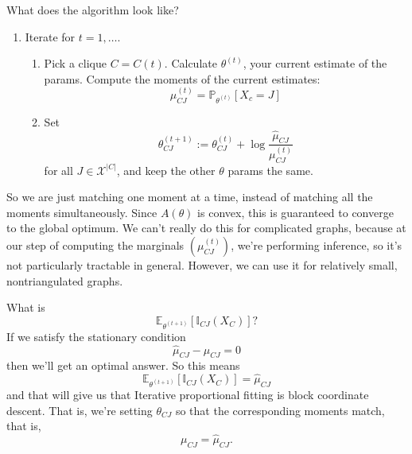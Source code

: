 \documentclass{article}
\newcommand{\E}{\mathbb{E}}
\begin{document}
What does the algorithm look like?
\begin{enumerate}
\item
Iterate for $t = 1,\ldots$.
\begin{enumerate}
	\item
	Pick a clique $C = C(t)$.
	Calculate $\theta^{(t)}$, your current estimate of the params.
	Compute the moments of the current estimates:
	$$
	\mu_{CJ}^{(t)} = \mathbb P_{\theta^{(t)}}[X_c = J]
	$$
	
	\item
	Set
	$$
	\theta_{CJ}^{(t+1)} :=
	\theta_{CJ}^{(t)} + \log\frac{{\hat\mu_{CJ}}}  {\mu^{(t)}_{CJ}}
	$$
	for all $ J\in \mathcal X^{|C|}$,
	and keep the other $\theta$ params the same.
\end{enumerate}
\end{enumerate}
So we are just matching one moment at a time, instead of matching all the moments simultaneously.
Since $A(\theta)$ is convex, this is guaranteed to converge to the global optimum.
We can't really do this for complicated graphs, because at our step of computing the marginals $(\mu_{CJ}^{(t)})$, we're performing inference, so it's not particularly tractable in general.
However, we can use it for relatively small, nontriangulated graphs.

What is
$$
\E_{\theta^{(t+1)}}[\mathbb I_{CJ}(X_C)]?
$$
If we satisfy the stationary condition
$$
\hat\mu_{CJ} - \mu_{CJ} = 0
$$
then we'll get an optimal answer.
So this means
$$
\E_{\theta^{(t+1)}}[\mathbb I_{CJ}(X_C)]
=
\hat\mu_{CJ}
$$
and that will give us that Iterative proportional fitting is block coordinate descent.
That is, we're setting $\theta_{CJ}$ so that the corresponding moments match, that is,
$$
\mu_{CJ} = \hat\mu_{CJ}.
$$
\end{document}
